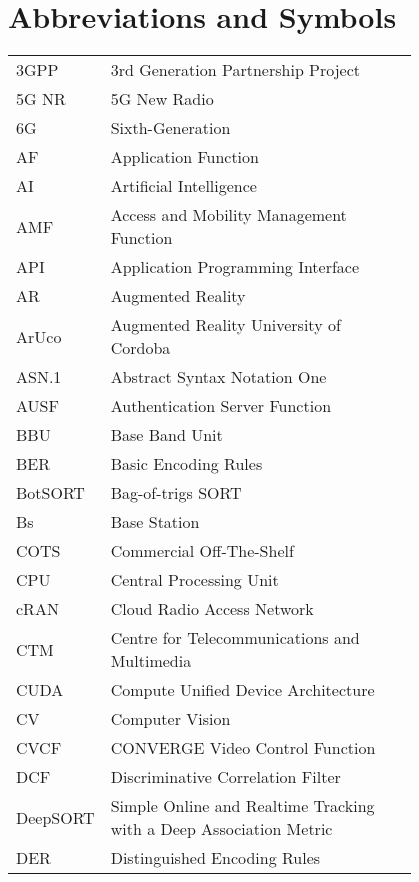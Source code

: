 \chapter*{Abbreviations and Symbols}

\begin{flushleft}
    \begin{tabular}{l p{0.8\linewidth}}
        3GPP & 3rd Generation Partnership Project \\
        5G NR & 5G New Radio \\
        6G & Sixth-Generation \\
        AF & Application Function \\
        AI & Artificial Intelligence \\
        AMF & Access and Mobility Management Function \\
        API & Application Programming Interface \\
        AR & Augmented Reality \\
        ArUco & Augmented Reality University of Cordoba \\
        ASN.1 & Abstract Syntax Notation One \\
        AUSF & Authentication Server Function \\
        BBU & Base Band Unit \\
        BER & Basic Encoding Rules \\
        BotSORT & Bag-of-trigs SORT \\
        Bs & Base Station \\
        COTS & Commercial Off-The-Shelf \\
        CPU & Central Processing Unit \\
        cRAN & Cloud Radio Access Network \\
        CTM & Centre for Telecommunications and Multimedia \\
        CUDA & Compute Unified Device Architecture \\
        CV & Computer Vision \\
        CVCF & CONVERGE Video Control Function \\
        DCF & Discriminative Correlation Filter \\
        DeepSORT & Simple Online and Realtime Tracking with a Deep Association Metric \\
        DER & Distinguished Encoding Rules \\

\end{tabular}
\end{flushleft}
